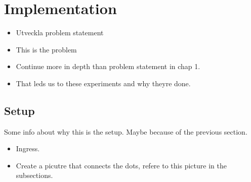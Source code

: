 \section{Implementation}


\begin{itemize}
\item Utveckla problem statement
\item This is the problem
\item Continue more in depth than problem statement in chap 1.
\item That leds us to these experiments and why theyre done.
\end{itemize}


\subsection{Setup}

Some info about why this is the setup. Maybe because of the previous section.
\begin{itemize}
\item Ingress.
\item Create a picutre that connects the dots, refere to this picture in the subsections.
\end{itemize}








